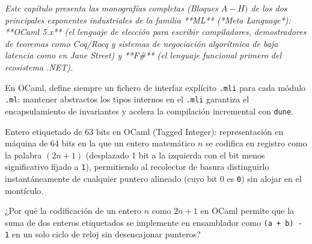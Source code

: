\documentclass{book}
\begin{document}
\noindent\textit{Este capítulo presenta las monografías completas (Bloques \(A-H)\) de los dos principales exponentes industriales de la familia **ML** (*Meta Language*): **OCaml 5.x** (el lenguaje de elección para escribir compiladores, demostradores de teoremas como Coq/Rocq y sistemas de negociación algorítmica de baja latencia como en Jane Street) y **F\#** (el lenguaje funcional primero del ecosistema .NET).}

\begin{tcolorbox}[title={Consejo}, studiumtip, breakable]

En OCaml, define siempre un fichero de interfaz explícito \texttt{.mli} para cada módulo \texttt{.ml}: mantener abstractos los tipos internos en el \texttt{.mli} garantiza el encapsulamiento de invariantes y acelera la compilación incremental con \texttt{dune}.
\end{tcolorbox}

\begin{tcolorbox}[title={Definición}, studiumdef, breakable]

Entero etiquetado de 63 bits en OCaml (Tagged Integer): representación en máquina de 64 bits en la que un entero matemático \(n\) se codifica en registro como la palabra \((2n + 1)\) (desplazado 1 bit a la izquierda con el bit menos significativo fijado a \texttt{1}), permitiendo al recolector de basura distinguirlo instantáneamente de cualquier puntero alineado (cuyo bit 0 es \texttt{0}) sin alojar en el montículo.
\end{tcolorbox}

\begin{tcolorbox}[title={Autoficha}, studiumcheck, breakable]

¿Por qué la codificación de un entero \(n\) como \(2n + 1\) en OCaml permite que la suma de dos enteros etiquetados se implemente en ensamblador como \texttt{(a + b) - 1} en un solo ciclo de reloj sin desencajonar punteros?
\end{tcolorbox}
\end{document}
